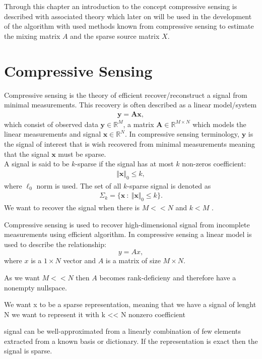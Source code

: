 Through this chapter an introduction to the concept compressive sensing is described with associated theory which later on will be used in the development of the algorithm with used methods known from compressive sensing to estimate the mixing matrix $A$ and the sparse source matrix $X$.

\section{Compressive Sensing}
Compressive sensing is the theory of efficient recover/reconstruct a signal from minimal measurements. This recovery is often described as a linear model/system 
\begin{align*}
\mathbf{y} = \mathbf{Ax},
\end{align*}
which consist of observed data $\mathbf{y} \in \mathbb{R}^M$, a matrix $\mathbf{A} \in \mathbb{R}^{M \times N}$ which models the linear measurements and signal $\mathbf{x} \in \mathbb{R}^N$. In compressive sensing terminology, $\mathbf{y}$ is the signal of interest that is wish recovered from minimal measurements meaning that the signal $\mathbf{x}$ must be sparse.
\\
A signal is said to be $k$-sparse if the signal has at most $k$ non-zeros coefficient: 
\begin{align*}
\Vert \mathbf{x} \Vert_0 \leq k,
\end{align*}
where $\ell_0$ norm is used. The set of all $k$-sparse signal is denoted as
\begin{align*}
\Sigma_k = \{ \mathbf{x} \ : \ \Vert \mathbf{x} \Vert_0 \leq k \}.
\end{align*}
We want to recover the signal when there is $M << N$ and $k < M$ \cite[p. 8]{??}.


Compressive sensing is used to recover high-dimensional signal from incomplete measurements using efficient algorithm. In compressive sensing a linear model is used to describe the relationship:
$$
y = Ax,
$$
where $x$ is a $1 \times N$ vector and $A$ is a matrix of size $M \times N$.

As we want $M << N$ then $A$ becomes rank-deficieny and therefore have a nonempty nullspace.

We want x to be a sparse representation, meaning that we have a signal of lenght N we want to represent it with k << N nonzero coefficient


signal can be well-approximated from a linearly combination of few elements extracted from a known basis or dictionary. If the representation is exact then the signal is sparse.

